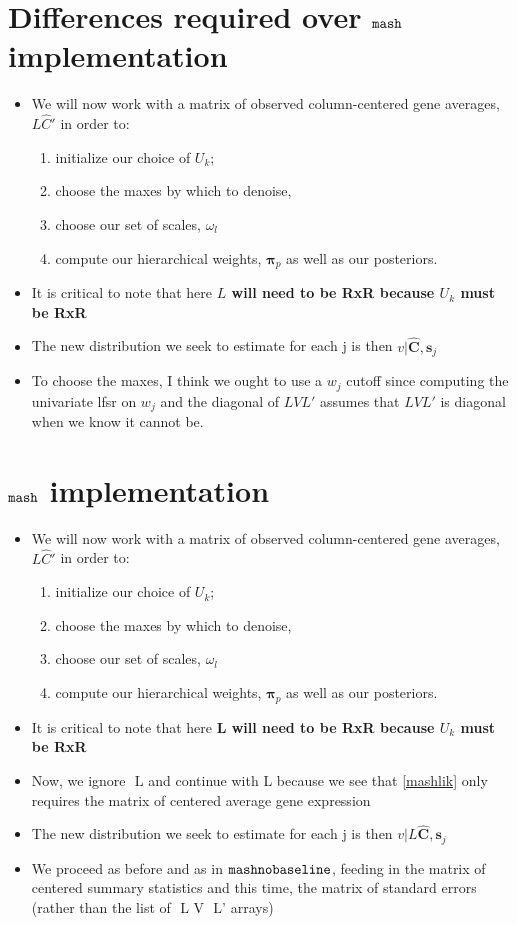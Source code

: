 \documentclass[11pt, oneside]{article}   	%
\newcommand{\chat}{\bm{\hat{C}}}
\def\lstar{\text{ L}}
\def\mash{{\tt mash }}
\def\mnb{{\tt mashnobaseline }}
\begin{document}
\begin{itemize}
\begin{itemize}
\section{Differences required over $\mash$ implementation}

\begin{itemize}
\item We will now work with a matrix of observed column-centered gene averages, $L \hat{C} '$ in order to:
\begin{enumerate}
	\item initialize our choice of $U_{k}$;
	\item  choose the maxes by which to denoise, 
	\item choose our set of scales, $\omega_{l}$
	\item compute our hierarchical weights, $\bm{\pi}_{p}$ as well as our posteriors. 
\end{enumerate}
\item It is critical to note that here \textbf{$L$ will need to be RxR because $U_{k}$ must be RxR}
\item The new distribution we seek to estimate for each j is then $v | $\lstar$ \chat , \bm{s}_{j}$
\item To choose the maxes, I think we ought to use a $w_{j}$ cutoff since computing the univariate lfsr on $w_{j}$ and the diagonal of $LVL'$ assumes that $LVL'$ is diagonal when we know it cannot be.
\end{itemize}

\section{ $\mash$ implementation}

\begin{itemize}
\item We will now work with a matrix of observed column-centered gene averages, $L \hat{C} '$ in order to:
\begin{enumerate}
	\item initialize our choice of $U_{k}$;
	\item  choose the maxes by which to denoise, 
	\item choose our set of scales, $\omega_{l}$
	\item compute our hierarchical weights, $\bm{\pi}_{p}$ as well as our posteriors. 
\end{enumerate}
\item It is critical to note that here \textbf{L will need to be RxR because $U_{k}$ must be RxR}
\item Now, we ignore $\lstar$ and continue with L because we see that \ref{mashlik} only requires the matrix of centered average gene expression
\item The new distribution we seek to estimate for each j is then $v | L \chat , \bm{s}_{j}$
\item We proceed as before and as in $\mnb$, feeding in the matrix of centered summary statistics and this time, the matrix of standard errors (rather than the list of $\lstar$ V $\lstar$' arrays)
\end{itemize}


\end{itemize}
\end{itemize}
\end{document}
